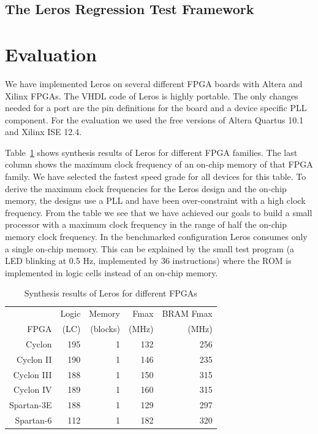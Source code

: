\documentclass[a4paper,fontsize=10pt,twoside,DIV15,BCOR12mm,headinclude=true,footinclude=false,pagesize,bibtotoc]{scrbook}
\begin{document}
\subsection{The Leros Regression Test Framework}

\section{Evaluation}
\label{sec:eval}

We have implemented Leros on several different FPGA boards with Altera and Xilinx FPGAs. The VHDL code of Leros is highly portable. The only changes needed for a port are the pin definitions for the board and a device specific PLL component. For the evaluation we used the free versions of Altera Quartus 10.1 and Xilinx ISE 12.4.


Table~\ref{tab:synth} shows synthesis results of Leros for different FPGA families. The last column shows the maximum clock frequency of an on-chip memory of that FPGA family. We have selected the fastest speed grade for all devices for this table. To derive the maximum clock frequencies for the Leros design and the on-chip memory, the designs use a PLL and have been over-constraint with a high clock frequency.
From the table we see that we have achieved our goals to build a small processor with a maximum clock frequency in the range of half the on-chip memory clock frequency. In the benchmarked configuration Leros consumes only a single on-chip memory. This can be explained by the small test program (a LED blinking at 0.5 Hz, implemented by 36 instructions) where the ROM is implemented in logic cells instead of an on-chip memory.


\begin{table}
\small
\centering 
\caption{Synthesis results of Leros for different FPGAs}
\label{tab:synth}
\begin{tabular}{rrrrr}
\toprule
 & Logic & Memory & Fmax & BRAM Fmax \\
 FPGA & (LC) & (blocks) & (MHz) & (MHz) \\
\midrule
Cyclon & 195 & 1 & 132 & 256 \\
Cyclon II & 190 & 1 & 146 & 235 \\
Cyclon III & 188 & 1 & 150 & 315 \\
Cyclon IV & 189 & 1 & 160 & 315 \\
Spartan-3E & 188 & 1 & 129 & 297 \\
Spartan-6 & 112 & 1 & 182 &  320 \\
\bottomrule
\end{tabular}
\end{table}
\end{document}
